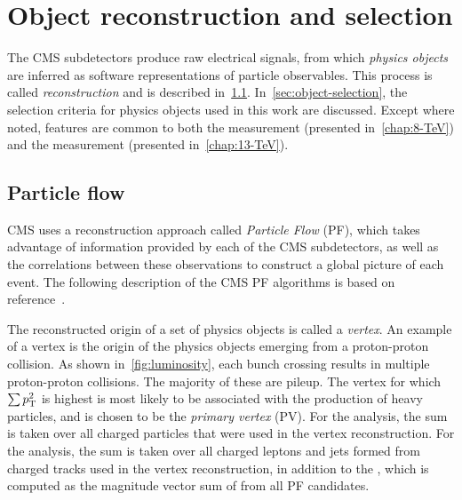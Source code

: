 \chapter{Object reconstruction and selection}
\label{chap:objects}
The CMS subdetectors produce raw electrical signals, from which \emph{physics
objects} are inferred as software representations of particle observables. This
process is called \emph{reconstruction} and is described
in~\cref{sec:particle-flow}. In~\cref{sec:object-selection}, the selection
criteria for physics objects used in this work are discussed. Except where
noted, features are common to both the \eightTeV measurement (presented
in~\cref{chap:8-TeV}) and the \thirteenTeV measurement (presented
in~\cref{chap:13-TeV}).

\section{Particle flow}
\label{sec:particle-flow}
CMS uses a reconstruction approach called \emph{Particle Flow} (PF), which takes
advantage of information provided by each of the CMS subdetectors, as well as
the correlations between these observations to construct a global picture of
each event. The following description of the CMS PF algorithms is based on
reference~\cite{Sirunyan:2017ulk}.

The reconstructed origin of a set of physics objects is called a \emph{vertex}.
An example of a vertex is the origin of the physics objects emerging from a
proton-proton collision. As shown in~\cref{fig:luminosity}, each bunch crossing
results in multiple proton-proton collisions. The majority of these are pileup.
The vertex for which $\sum p_\text{T}^2$ is highest is most likely to be associated with
the production of heavy particles, and is chosen to be the \emph{primary vertex}
(PV). For the \eightTeV analysis, the sum is taken over all charged particles
that were used in the vertex reconstruction. For the \thirteenTeV analysis, the
sum is taken over all charged leptons and jets formed from charged tracks used
in the vertex reconstruction, in addition to the \pTmiss, which is computed as
the magnitude vector sum of \pT from all PF candidates.

